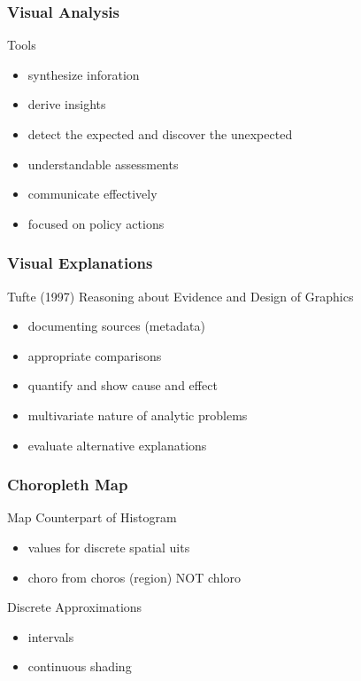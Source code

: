 \documentclass[nototal]{beamer}
\begin{document}
\begin{frame}
	\frametitle{Visual Analysis}
 
\begin{block}{Tools}
 \begin{itemize}
 \item  synthesize inforation
 \item  derive insights
 \item  detect the expected and discover the unexpected
 \item  understandable assessments
 \item  communicate effectively
 \item  focused on policy actions
 \end{itemize}
 \end{block} \end{frame} 

\begin{frame}
	\frametitle{Visual Explanations}
 
\begin{block}{Tufte (1997)}
  Reasoning about Evidence and Design of Graphics
 \begin{itemize}
 \item  documenting sources (metadata)
 \item  appropriate comparisons
 \item  quantify and show cause and effect
 \item  multivariate nature of analytic problems
 \item  evaluate alternative explanations
 \end{itemize}
 \end{block} \end{frame} 

\begin{frame}
	\frametitle{Choropleth Map}
 
\begin{block}{Map Counterpart of Histogram}
 \begin{itemize}
 \item  values for discrete spatial uits
 \item  choro from  choros (region) NOT chloro
 \end{itemize}
 \end{block} 
\begin{block}{Discrete Approximations}
 \begin{itemize}
 \item  intervals
 \item  continuous shading
 \end{itemize}
 \end{block} \end{frame} 
\end{document}
